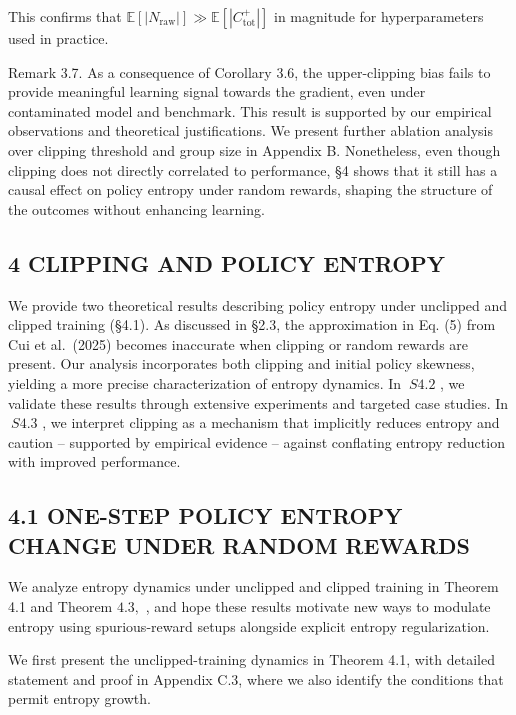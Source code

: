 \documentclass[
  10
]{article}
\begin{document}
This confirms that
\(\mathbb { E } [ | N _ { \mathrm { r a w } } | ] \gg \mathbb { E } [ | C _ { \mathrm { t o t } } ^ { + } | ]\)
in magnitude for hyperparameters used in practice.

Remark 3.7. As a consequence of Corollary 3.6, the upper-clipping bias
fails to provide meaningful learning signal towards the gradient, even
under contaminated model and benchmark. This result is supported by our
empirical observations and theoretical justifications. We present
further ablation analysis over clipping threshold and group size in
Appendix B. Nonetheless, even though clipping does not directly
correlated to performance, §4 shows that it still has a causal effect on
policy entropy under random rewards, shaping the structure of the
outcomes without enhancing learning.

\subsection{4 CLIPPING AND POLICY
ENTROPY}\label{clipping-and-policy-entropy}

We provide two theoretical results describing policy entropy under
unclipped and clipped training (§4.1). As discussed in §2.3, the
approximation in Eq. (5) from Cui et al.~(2025) becomes inaccurate when
clipping or random rewards are present. Our analysis incorporates both
clipping and initial policy skewness, yielding a more precise
characterization of entropy dynamics. In \(\ S 4 . 2\) , we validate
these results through extensive experiments and targeted case studies.
In \(\ S 4 . 3\) , we interpret clipping as a mechanism that implicitly
reduces entropy and caution -- supported by empirical evidence --
against conflating entropy reduction with improved performance.

\subsection{4.1 ONE-STEP POLICY ENTROPY CHANGE UNDER RANDOM
REWARDS}\label{one-step-policy-entropy-change-under-random-rewards}

We analyze entropy dynamics under unclipped and clipped training in
Theorem 4.1 and Theorem \(4 . 3 ,\) , and hope these results motivate
new ways to modulate entropy using spurious-reward setups alongside
explicit entropy regularization.

We first present the unclipped-training dynamics in Theorem 4.1, with
detailed statement and proof in Appendix C.3, where we also identify the
conditions that permit entropy growth.
\end{document}
